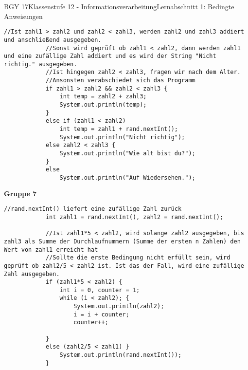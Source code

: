 \documentclass[oneside,openany,headings=optiontotoc,11pt,numbers=noenddot]{scrreprt}
\begin{document}
\begin{worksheet}{BGY 17}{Klassenstufe 12 - Informationsverarbeitung}{Lernabschnitt 1: Bedingte Anweisungen}
\begin{lstlisting}[style=JavaInputStyle]
			//Ist zahl1 > zahl2 und zahl2 < zahl3, werden zahl2 und zahl3 addiert und anschließend ausgegeben.
			//Sonst wird geprüft ob zahl1 < zahl2, dann werden zahl1 und eine zufällige Zahl addiert und es wird der String "Nicht richtig." ausgegeben.
			//Ist hingegen zahl2 < zahl3, fragen wir nach dem Alter.
			//Ansonsten verabschiedet sich das Programm
			if zahl1 > zahl2 && zahl2 < zahl3 {
				int temp = zahl2 + zahl3;
				System.out.println(temp);
			}
			else if (zahl1 < zahl2)
				int temp = zahl1 + rand.nextInt();
				System.out.println("Nicht richtig");
			else zahl2 < zahl3 {
				System.out.println("Wie alt bist du?");
			}
			else
				System.out.println("Auf Wiedersehen.");
		\end{lstlisting}
		\newpage
		\textbf{Gruppe 7}
		\begin{lstlisting}[style=JavaInputStyle]
			//rand.nextInt() liefert eine zufällige Zahl zurück
			int zahl1 = rand.nextInt(), zahl2 = rand.nextInt();
			
			//Ist zahl1*5 < zahl2, wird solange zahl2 ausgegeben, bis zahl3 als Summe der Durchlaufnummern (Summe der ersten n Zahlen) den Wert von zahl1 erreicht hat
			//Sollte die erste Bedingung nicht erfüllt sein, wird geprüft ob zahl2/5 < zahl2 ist. Ist das der Fall, wird eine zufällige Zahl ausgegeben.
			if (zahl1*5 < zahl2) {
				int i = 0, counter = 1;
				while (i < zahl2); {
					System.out.println(zahl2);
					i = i + counter;
					counter++;
			
			}
			else (zahl2/5 < zahl1) }
				System.out.println(rand.nextInt());
			}
		\end{lstlisting}
	\end{worksheet}
\end{document}
